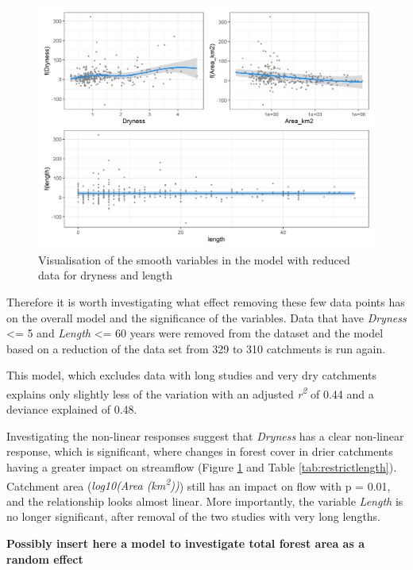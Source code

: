 \documentclass[]{elsarticle} %
\begin{document}
\begin{figure}
\includegraphics[width=0.9\linewidth]{model_redLength_smooths} \caption{Visualisation of the smooth variables in the model with reduced data for dryness and length}\label{fig:smoothsmodelredLength}
\end{figure}

Therefore it is worth investigating what effect removing these few data points has on the overall model and the significance of the variables. Data that have \emph{Dryness} \textless= 5 and \emph{Length} \textless= 60 years were removed from the dataset and the model based on a reduction of the data set from 329 to 310 catchments is run again.

This model, which excludes data with long studies and very dry catchments explains only slightly less of the variation with an adjusted \emph{r\textsuperscript{2}} of 0.44 and a deviance explained of 0.48.

Investigating the non-linear responses suggest that \emph{Dryness} has a clear non-linear response, which is significant, where changes in forest cover in drier catchments having a greater impact on streamflow (Figure \ref{fig:smoothsmodelredLength} and Table \ref{tab:restrictlength}). Catchment area (\emph{log10(Area (km\textsuperscript{2}))}) still has an impact on flow with p = 0.01, and the relationship looks almost linear. More importantly, the variable \emph{Length} is no longer significant, after removal of the two studies with very long lengths.

\textbf{Possibly insert here a model to investigate total forest area as a random effect}
\end{document}
